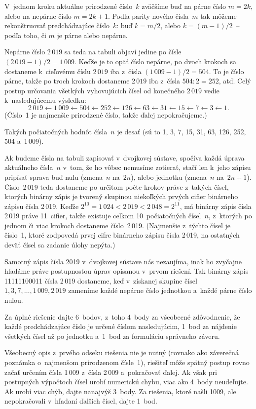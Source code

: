{%
V~jednom kroku aktuálne prirodzené číslo~$k$ zväčšíme buď na párne číslo
$m=2k$, alebo na nepárne číslo $m=2k+1$. Podľa parity nového čísla~$m$
tak môžeme rekonštruovať predchádzajúce číslo~$k$: buď $k=m/2$, alebo
$k=(m-1)/2$~-- podľa toho, či $m$ je párne alebo nepárne.

Nepárne číslo $2\,019$ sa teda na tabuli objaví jedine
po čísle $(2\,019-1)/2=1\,009$. Keďže je to opäť číslo nepárne,
po dvoch krokoch sa dostaneme k~cieľovému číslu $2\,019$
iba z~čísla $(1\,009-1)/2=504$. To je číslo párne, takže
po troch krokoch dostaneme $2\,019$ iba z~čísla $504:2=252$,
atď. Celý postup určovania všetkých vyhovujúcich čísel od konečného $2\,019$
vedie k~nasledujúcemu výsledku:
$$
2\,019\gets1\,009\gets504\gets252\gets126\gets63\gets
31\gets15\gets7\gets3\gets1.
$$
(Číslo~1 je najmenšie prirodzené číslo, takže ďalej nepokračujeme.)

\odpoved
Takých počiatočných hodnôt čísla~$n$ je desať
(sú to 1, 3, 7, 15, 31, 63, 126, 252, 504 a~1\,009).

\ineres
Ak budeme čísla na tabuli zapisovať v~dvojkovej sústave, spočíva každá
úprava aktuálneho čísla~$n$ v~tom, že ho vôbec nemusíme zotierať, stačí len
k~jeho zápisu pripísať sprava buď nulu (zmena~$n$ na~$2n$),
alebo jednotku (zmena~$n$ na~${2n+1}$). Číslo~2\,019 teda dostaneme
po určitom počte krokov práve z~takých čísel, ktorých binárny zápis
je tvorený skupinou niekoľkých prvých cifier binárneho zápisu čísla 2\,019.
Keďže $2^{10}=1\,024<2\,019<2\,048=2^{11}$, má binárny zápis čísla 2\,019
práve 11~cifier, takže existuje celkom 10~počiatočných čísel~$n$, z~ktorých
po jednom či viac krokoch dostaneme číslo~2\,019.
(Najmenšie z~týchto čísel je číslo~1, ktoré zodpovedá prvej cifre binárneho
zápisu čísla 2\,019, na ostatných deväť čísel sa zadanie úlohy nepýta.)

\poznamka
Samotný zápis čísla 2019 v~dvojkovej sústave nás nezaujíma, inak ho
zvyčajne hľadáme práve postupnosťou úprav opísanou v~prvom riešení.
Tak binárny zápis 11111100011 čísla 2\,019 dostaneme, keď v~získanej
skupine čísel $1, 3, 7,\dots, 1\,009,\allowbreak 2\,019$ zameníme každé nepárne číslo
jednotkou a~každé párne číslo nulou.


\nobreak\medskip\petit\noindent
Za úplné riešenie dajte 6~bodov, z~toho 4~body za všeobecné zdôvodnenie, že
každé predchádzajúce číslo je určené číslom nasledujúcim,
1~bod za nájdenie všetkých čísel až po jednotku
a~1~bod za formuláciu správneho záveru.

Všeobecný opis z~prvého odseku riešenia nie je nutný (rovnako ako
záverečná poznámka o~najmenšom prirodzenom čísle~1),
riešiteľ môže spätný postup rovno začať určením čísla 1\,009 z~čísla
2\,009 a~pokračovať ďalej.
Ak však pri postupných výpočtoch
čísel urobí numerickú chybu, viac ako 4~body neudeľujte.
Ak urobí viac chýb, dajte nanajvýš 3~body.
Za riešenia, ktoré našli 1009, ale nepokračovali v~hľadaní ďalších čísel, dajte 1~bod.

}
